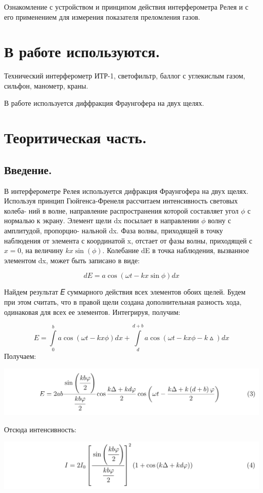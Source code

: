 \documentclass[a4paper,12pt]{article} %
\begin{document}
Ознакомление с устройством и принципом действия интерферометра Релея и с его применением для измерения показателя преломления газов.

\section{В работе используются.}

Технический интерферометр ИТР-1, светофильтр, баллог с углекислым газом, сильфон, манометр, краны.

В работе используется диффракция Фраунгофера на двух щелях.

\section{Теоритическая часть.}

\subsection{Введение.}

В интерферометре Релея используется дифракция Фраунгофера на двух щелях.
Используя принцип Гюйгенса-Френеля рассчитаем интенсивность световых колеба-
ний в волне, направление распространения которой составляет угол $\phi$ с нормалью к
экрану. Элемент щели dx посылает в направлении $\phi$ волну с амплитудой, пропорцио-
нальной dx. Фаза волны, приходящей в точку наблюдения от элемента с координатой
x, отстает от фазы волны, приходящей с $x = 0$, на величину $kx \sin(\phi)$. Колебание dE
в точка наблюдения, вызванное элементом dx, может быть записано в виде:

\begin{equation}
    dE = a \cos(\omega t - kx \sin \phi) dx
\end{equation}

Найдем результат 𝐸 суммарного действия всех элементов обоих щелей. Будем
при этом считать, что в правой щели создана дополнительная разность хода,
одинаковая для всех ее элементов. Интегрируя, получим:

\begin{equation}
    E = \int\limits_0^b a \cos(\omega t - kx \phi) dx +
    \int \limits_d^{d + b} a \cos(\omega t - kx\phi - k\vartriangle)dx
\end{equation}
Получаем:
\begin{center}
    \includegraphics[scale = 0.4]{eq1}
\end{center}
Отсюда интенсивность:
\begin{center}
    \includegraphics[scale = 0.4]{eq2}
\end{center}
\end{document}
